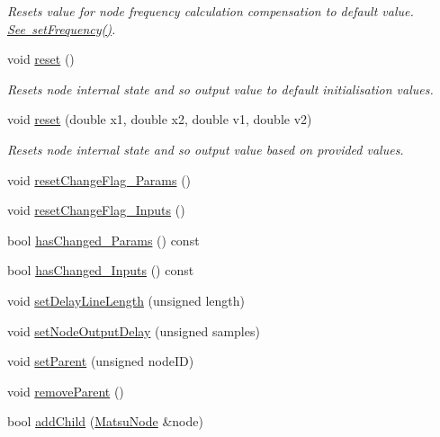 \begin{DoxyCompactItemize}
\begin{DoxyCompactList}\small\item\em Resets value for node frequency calculation compensation to default value. \mbox{\hyperlink{classMatsuNode_adb33b1e7dcfaf786be5d99627bca1c14}{See set\+Frequency()}}. \end{DoxyCompactList}\item 
void \mbox{\hyperlink{classMatsuNode_a233ded2ac8a081385c56d52be06965b5}{reset}} ()
\begin{DoxyCompactList}\small\item\em Resets node internal state and so output value to default initialisation values. \end{DoxyCompactList}\item 
void \mbox{\hyperlink{classMatsuNode_a4649b0229d516bffa0129565b1805602}{reset}} (double x1, double x2, double v1, double v2)
\begin{DoxyCompactList}\small\item\em Resets node internal state and so output value based on provided values. \end{DoxyCompactList}\item 
void \mbox{\hyperlink{classMatsuNode_a155f3533b85aacccd528ce7b04e24289}{reset\+Change\+Flag\+\_\+\+Params}} ()
\item 
void \mbox{\hyperlink{classMatsuNode_a660a6945b92c6e50f8b17981f63ba6d4}{reset\+Change\+Flag\+\_\+\+Inputs}} ()
\item 
bool \mbox{\hyperlink{classMatsuNode_ac7db555868e678c3850e9835f22c54d7}{has\+Changed\+\_\+\+Params}} () const
\item 
bool \mbox{\hyperlink{classMatsuNode_a28d7cc7a1e352f941d5fa696031c4bbc}{has\+Changed\+\_\+\+Inputs}} () const
\item 
void \mbox{\hyperlink{classMatsuNode_a6b5b32c4489129fd184638a9c9ed36d4}{set\+Delay\+Line\+Length}} (unsigned length)
\item 
void \mbox{\hyperlink{classMatsuNode_ae4d26af98e34d1595cb9cc65a89ea8ff}{set\+Node\+Output\+Delay}} (unsigned samples)
\item 
void \mbox{\hyperlink{classMatsuNode_ab357c154c95d3e289921cc79ef8cf94e}{set\+Parent}} (unsigned node\+ID)
\item 
void \mbox{\hyperlink{classMatsuNode_aadd9d80a48b3c5f2bcfed3801f644e24}{remove\+Parent}} ()
\item 
bool \mbox{\hyperlink{classMatsuNode_a7056a59c333c238b2a583b59bcdb278d}{add\+Child}} (\mbox{\hyperlink{classMatsuNode}{Matsu\+Node}} \&node)
\item 

\end{DoxyCompactItemize}
